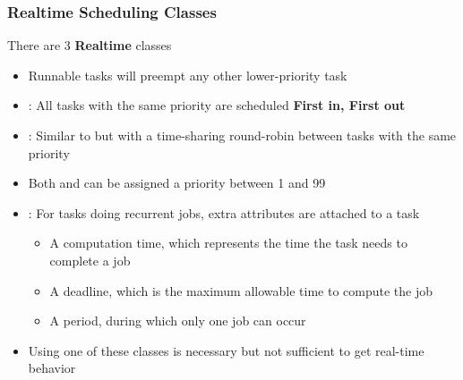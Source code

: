 \begin{frame}
        \frametitle{Realtime Scheduling Classes}
        There are 3 \textbf{Realtime} classes
        \begin{itemize}
                \item Runnable tasks will preempt any other lower-priority task
                \item {}: All tasks with the same priority are scheduled \textbf{First in, First out}
                \item {}: Similar to  but with a time-sharing round-robin between tasks with the same priority
                \item Both  and  can be assigned a priority between 1 and 99
                \item {}: For tasks doing recurrent jobs, extra attributes are attached to a task
                        \begin{itemize}
                                \item A computation time, which represents the time the task needs to complete a job
                                \item A deadline, which is the maximum allowable time to compute the job
                                \item A period, during which only one job can occur
                        \end{itemize}
                \item Using one of these classes is necessary but not sufficient to get real-time behavior
        \end{itemize}
\end{frame}

